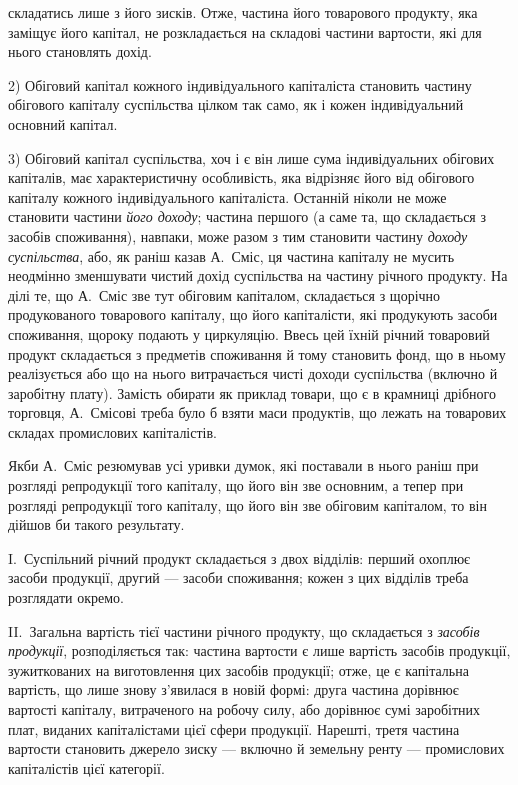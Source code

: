 \parcont{}  %
складатись лише з його зисків. Отже, частина його товарового продукту,
яка заміщує його капітал, не розкладається на складові частини вартости,
які для нього становлять дохід.

2) Обіговий капітал кожного індивідуального капіталіста становить
частину обігового капіталу суспільства цілком так само, як і кожен індивідуальний
основний капітал.

3) Обіговий капітал суспільства, хоч і є він лише сума індивідуальних
обігових капіталів, має характеристичну особливість, яка відрізняє
його від обігового капіталу кожного індивідуального капіталіста. Останній
ніколи не може становити частини \emph{його доходу}; частина першого
(а саме та, що складається з засобів споживання), навпаки, може разом
з тим становити частину \emph{доходу суспільства}, або, як раніш казав
А.~Сміс, ця частина капіталу не мусить неодмінно зменшувати чистий
дохід суспільства на частину річного продукту. На ділі те, що А.~Сміс
зве тут обіговим капіталом, складається з щорічно продукованого товарового
капіталу, що його капіталісти, які продукують засоби споживання,
щороку подають у циркуляцію. Ввесь цей їхній річний товаровий продукт
складається з предметів споживання й тому становить фонд, що в ньому
реалізується або що на нього витрачається чисті доходи суспільства (включно
й заробітну плату). Замість обирати як приклад товари, що є в крамниці
дрібного торговця, А.~Смісові треба було б взяти маси продуктів, що
лежать на товарових складах промислових капіталістів.

Якби А.~Сміс резюмував усі уривки думок, які поставали в нього
раніш при розгляді репродукції того капіталу, що його він зве основним,
а тепер при розгляді репродукції того капіталу, що його він зве
обіговим капіталом, то він дійшов би такого результату.

I.~Суспільний річний продукт складається з двох відділів: перший
охоплює засоби продукції, другий — засоби споживання; кожен з цих
відділів треба розглядати окремо.

II.~Загальна вартість тієї частини річного продукту, що складається
з \emph{засобів продукції}, розподіляється так: частина вартости є
лише вартість засобів продукції, зужиткованих на виготовлення цих засобів
продукції; отже, це є капітальна вартість, що лише знову з’явилася
в новій формі: друга частина дорівнює вартості капіталу, витраченого
на робочу силу, або дорівнює сумі заробітних плат, виданих капіталістами
цієї сфери продукції. Нарешті, третя частина вартости становить
джерело зиску — включно й земельну ренту — промислових капіталістів
цієї категорії.

